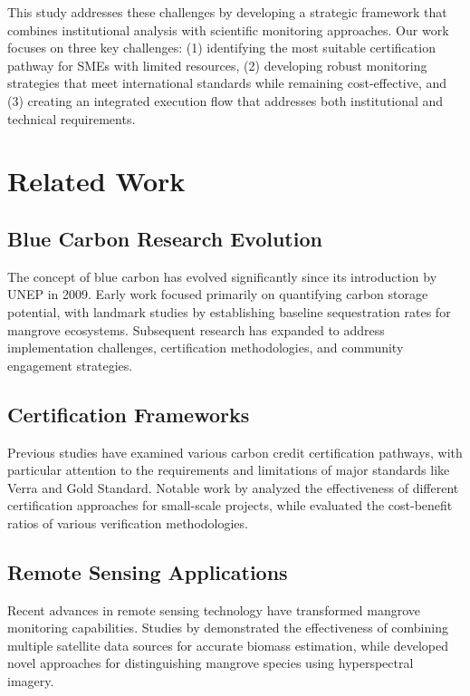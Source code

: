 \documentclass{article}
\theoremstyle{plain}
\theoremstyle{definition}
\theoremstyle{remark}
\begin{document}
\begin{multicols}{2}
This study addresses these challenges by developing a strategic framework that combines institutional analysis with scientific monitoring approaches. Our work focuses on three key challenges: (1) identifying the most suitable certification pathway for SMEs with limited resources, (2) developing robust monitoring strategies that meet international standards while remaining cost-effective, and (3) creating an integrated execution flow that addresses both institutional and technical requirements.

\section{Related Work}

\subsection{Blue Carbon Research Evolution}
The concept of blue carbon has evolved significantly since its introduction by UNEP in 2009. Early work focused primarily on quantifying carbon storage potential, with landmark studies by \cite{donato2011} establishing baseline sequestration rates for mangrove ecosystems. Subsequent research has expanded to address implementation challenges, certification methodologies, and community engagement strategies.

\subsection{Certification Frameworks}
Previous studies have examined various carbon credit certification pathways, with particular attention to the requirements and limitations of major standards like Verra and Gold Standard. Notable work by \cite{smith2019} analyzed the effectiveness of different certification approaches for small-scale projects, while \cite{jones2020} evaluated the cost-benefit ratios of various verification methodologies.

\subsection{Remote Sensing Applications}
Recent advances in remote sensing technology have transformed mangrove monitoring capabilities. Studies by \cite{wang2019} demonstrated the effectiveness of combining multiple satellite data sources for accurate biomass estimation, while \cite{chen2021} developed novel approaches for distinguishing mangrove species using hyperspectral imagery.


\end{multicols}
\end{document}
